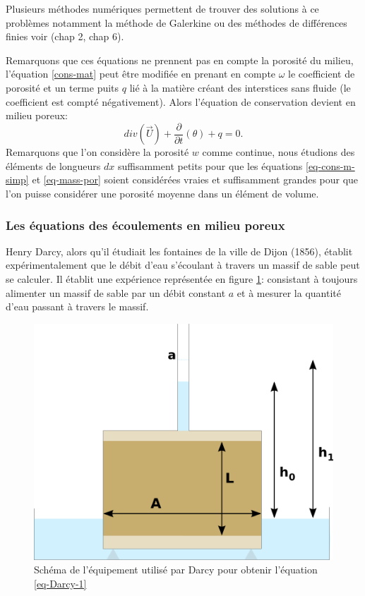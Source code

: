\documentclass[a4paper,11pt]{article}
\numberwithin{equation}{section}
\begin{document}
Plusieurs méthodes numériques permettent de trouver des solutions à ce problèmes notamment la méthode de Galerkine ou des méthodes de différences finies voir \cite{allaire2005analyse} (chap 2, chap 6). 

\vspace{7mm}

Remarquons que ces équations ne prennent pas en compte la porosité du milieu, l'équation \eqref{cons-mat} peut être modifiée en prenant en compte $\omega$ le coefficient de porosité et un terme puits $q$ lié à la matière créant des interstices sans fluide (le coefficient est compté négativement). Alors l'équation de conservation devient en milieu poreux:
\begin{equation}
	\label{eq-mass-por}
	div(\overrightarrow{U})+\frac{\partial}{\partial t}(\theta)+ q=0.
\end{equation}
Remarquons que l'on considère la porosité $w$ comme continue, nous étudions des éléments de longueurs $dx$ suffisamment petits pour que les équations \eqref{eq-cons-m-simp} et \eqref{eq-mass-por} soient considérées vraies et suffisamment grandes pour que l'on puisse considérer une porosité moyenne dans un élément de volume.

\subsubsection{Les équations des écoulements en milieu poreux}
\label{Darcy}
Henry Darcy, alors qu'il étudiait les fontaines de la ville de Dijon (1856), établit expérimentalement que le débit d'eau s'écoulant à travers un massif de sable peut se calculer. Il établit une expérience représentée en figure \ref{fig-Darcy}: consistant à toujours alimenter un massif de sable par un débit constant $a$ et à mesurer la quantité d'eau passant à travers le massif.

\begin{figure}[H]
	\begin{center}
		\includegraphics[scale=0.4]{darcy.png}
		\caption{Schéma de l'équipement utilisé par Darcy pour obtenir l'équation \eqref{eq-Darcy-1}}
	\end{center}
	\label{fig-Darcy}
\end{figure}
\end{document}
